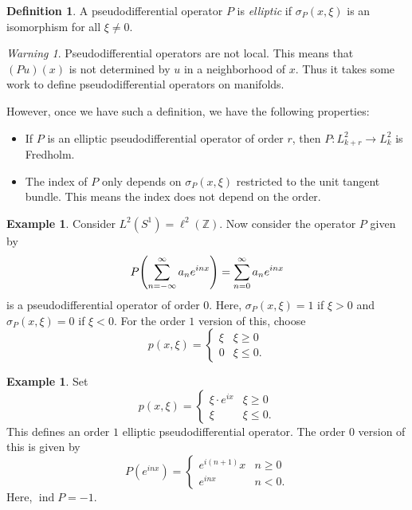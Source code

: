 \documentclass[leqno, openany]{memoir}
\theoremstyle{definition}
\newtheorem{defn}[thm]{Definition}
\newtheorem{exm}[thm]{Example}
\theoremstyle{remark}
\newtheorem{warn}[thm]{Warning}
\theoremstyle{plain}
\theoremstyle{definition}
\theoremstyle{remark}
\newcommand{\Z}{\mathbb{Z}}
\DeclareMathOperator{\ind}{ind}
\begin{document}
\begin{defn} A pseudodifferential operator $P$ is \textit{elliptic} if
$\sigma_P(x, \xi)$ is an isomorphism for all $\xi \neq 0$.  \end{defn}

\begin{warn} Pseudodifferential operators are not local. This means that
$(Pu)(x)$ is not determined by $u$ in a neighborhood of $x$. Thus it takes some
work to define pseudodifferential operators on manifolds.  \end{warn}

However, once we have such a definition, we have the following properties:
\begin{itemize} \item If $P$ is an elliptic pseudodifferential operator of
    order $r$, then $P \colon L^2_{k+r} \to L^2_k$ is Fredholm.  \item The
    index of $P$ only depends on $\sigma_P(x, \xi)$ restricted to the unit
    tangent bundle. This means the index does not depend on the order.
    \end{itemize}

\begin{exm} Consider $L^2(S^1) = \ell^2(\Z)$. Now consider the operator $P$
    given by \[ P\qty(\sum_{n=-\infty}^{\infty} a_n e^{inx}) =
    \sum_{n=0}^{\infty} a_n e^{inx} \] is a pseudodifferential operator of
    order $0$. Here, $\sigma_P(x, \xi) = 1$ if $\xi > 0$ and $\sigma_P(x, \xi)
    = 0$ if $\xi < 0$. For the order $1$ version of this, choose \[ p(x, \xi) =
        \begin{cases} \xi & \xi \geq 0 \\ 0 & \xi \leq 0.  \end{cases} \]
    \end{exm}

\begin{exm} Set \[ p(x, \xi) = \begin{cases} \xi \cdot e^{ix} & \xi \geq 0 \\
    \xi & \xi \leq 0.  \end{cases} \] This defines an order $1$ elliptic
    pseudodifferential operator. The order $0$ version of this is given by \[
        P(e^{inx}) = \begin{cases} e^{i(n+1)} x & n \geq 0 \\ e^{inx} & n < 0.
        \end{cases} \] Here, $\ind P = -1$.  \end{exm}
\end{document}
